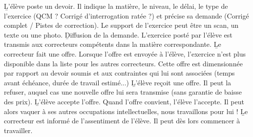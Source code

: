 \begin{enumerate}
\li \b{L'élève poste un devoir}. Il indique la matière, le niveau, le délai, le type de l'exercice (QCM ? Corrigé d'interrogation ratée ?) et précise sa demande (Corrigé complet / Pistes de correction). Le support de l'exercice peut être un scan, un texte ou une photo.
\li \b{Diffusion de la demande}. L'exercice posté par l'élève est transmis aux correcteurs compétents dans la matière correspondante.
\li \b{Le correcteur fait une offre}.  Lorsque l'offre est envoyée à l'élève, l'exercice n'est plus disponible dans la liste pour les autres correcteurs. Cette offre est dimensionnée par rapport au devoir soumis et aux contraintes qui lui sont associées (temps avant échéance, durée de travail estimé...)
\li \b{L'élève reçoit une offre}. Il peut la refuser, auquel cas une nouvelle offre lui sera transmise (sans garantie de baisse des prix).
\li \b{L'élève accepte l'offre}. Quand l'offre convient, l'élève l'accepte. Il peut alors vaquer à ses autres occupations intellectuelles, nous travaillons pour lui !
\li \b{Le correcteur est informé de l'assentiment de l'élève}. Il peut dès lors commencer à travailler.
\end{enumerate}